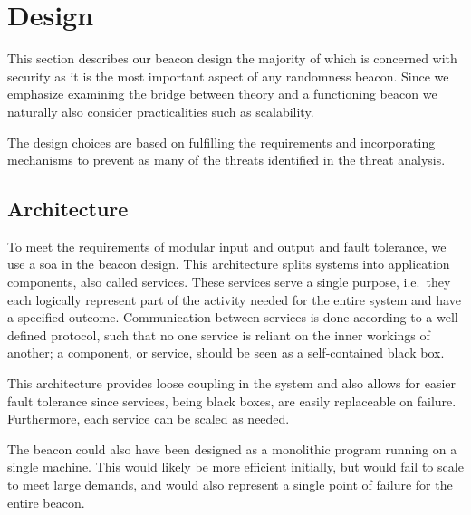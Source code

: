 \section{Design}\label{sec:design}

This section describes our beacon design the majority of which is concerned with security as it is the most important aspect of any randomness beacon.
Since we emphasize examining the bridge between theory and a functioning beacon we naturally also consider practicalities such as scalability.

The design choices are based on fulfilling the requirements and incorporating mechanisms to prevent as many of the threats identified in the threat analysis.

\subsection{Architecture}\label{sec:design_architecture}
To meet the requirements of modular input and output and fault tolerance, we use a \gls{soa} in the beacon design.
This architecture splits systems into application components, also called services.
These services serve a single purpose, i.e.\ they each logically represent part of the activity needed for the entire system and have a specified outcome.
Communication between services is done according to a well-defined protocol, such that no one service is reliant on the inner workings of another;
a component, or service, should be seen as a self-contained black box.

This architecture provides loose coupling in the system and also allows for easier fault tolerance since services, being black boxes, are easily replaceable on failure.
Furthermore, each service can be scaled as needed.

The beacon could also have been designed as a monolithic program running on a single machine.
This would likely be more efficient initially, but would fail to scale to meet large demands, and would also represent a single point of failure for the entire beacon.

